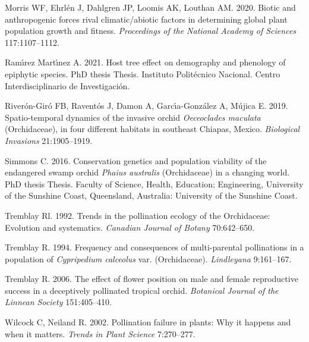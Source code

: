 \documentclass[
  12pt,
  letterpaper,
]{book}
\newlength{\cslhangindent}
\newenvironment{CSLReferences}[2] %
 {\begin{list}{}{%
  \setlength{\itemindent}{0pt}
  \setlength{\leftmargin}{0pt}
  \setlength{\parsep}{0pt}
  \ifodd #1
   \setlength{\leftmargin}{\cslhangindent}
   \setlength{\itemindent}{-1\cslhangindent}
  \fi
  \setlength{\itemsep}{#2\baselineskip}}}
 {\end{list}}
\begin{document}
\begin{CSLReferences}{1}{0}
Morris WF, Ehrlén J, Dahlgren JP, Loomis AK, Louthan AM. 2020. Biotic
and anthropogenic forces rival climatic/abiotic factors in determining
global plant population growth and fitness. \emph{Proceedings of the
National Academy of Sciences} 117:1107--1112.

Ramı́rez Martı́nez A. 2021. Host tree effect on demography and phenology
of epiphytic species. PhD thesis Thesis. Instituto Polit{é}cnico
Nacional. Centro Interdisciplinario de Investigaci{ó}n.

Riverón-Giró FB, Raventós J, Damon A, Garcı́a-González A, Mújica E. 2019.
Spatio-temporal dynamics of the invasive orchid \emph{{O}eceoclades
{m}aculata} ({O}rchidaceae), in four different habitats in southeast
{C}hiapas, {M}exico. \emph{Biological Invasions} 21:1905--1919.

Simmons C. 2016. Conservation genetics and population viability of the
endangered swamp orchid \emph{{P}haius {a}ustralis} ({O}rchidaceae) in a
changing world. PhD thesis Thesis. Faculty of Science, Health,
Education; Engineering, University of the Sunshine Coast, Queensland,
Australia: University of the Sunshine Coast.

Tremblay Rl. 1992. Trends in the pollination ecology of the
{O}rchidaceae: Evolution and systematics. \emph{Canadian Journal of
Botany} 70:642--650.

Tremblay R. 1994. Frequency and consequences of multi-parental
pollinations in a population of \emph{{C}ypripedium {c}alceolus} var.
 ({O}rchidaceae). \emph{Lindleyana} 9:161--167.

Tremblay R. 2006. The effect of flower position on male and female
reproductive success in a deceptively pollinated tropical orchid.
\emph{Botanical Journal of the Linnean Society} 151:405--410.

Wilcock C, Neiland R. 2002. Pollination failure in plants: Why it
happens and when it matters. \emph{Trends in Plant Science} 7:270--277.

\end{CSLReferences}


\backmatter
\end{document}
